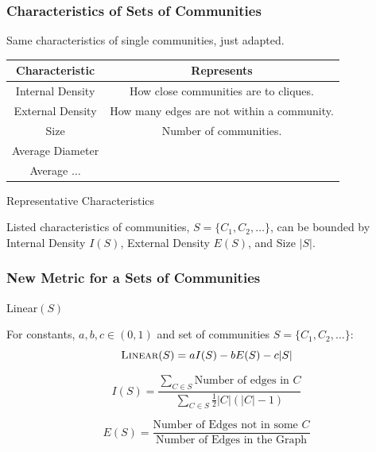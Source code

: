 \documentclass{beamer}
\begin{document}
\begin{frame}\frametitle{Characteristics of Sets of Communities}

Same characteristics of single communities, just adapted.

\begin{table}[t]
\centering
\begin{tabular}{c|c}
Characteristic & Represents \\ \hline
 {\sc Internal Density} &  How close communities are to cliques. \\
 {\sc External Density} & How many edges are not within a community. \\
 {\sc Size} & Number of communities.\\
 {\sc Average Diameter} &  \\
{\sc Average} $\dots$ &
\end{tabular}
\end{table}

\begin{block}{Representative Characteristics}
\begin{center}
Listed characteristics of  communities, $S = \{C_1, C_2, \dots\}$, can be bounded by {\sc Internal Density} $I(S)$, {\sc External Density} $E(S)$, and {\sc Size} $|S|$.
\end{center}
\end{block}
\end{frame}



\begin{frame}\frametitle{New Metric for a Sets of Communities}

\begin{block}{{\sc Linear}$(S)$}
\begin{center}
For constants, $a,b,c \in (0, 1)$ and set of communities $S = \{C_1, C_2, \dots \}$:
\begin{equation}
\mbox{\sc Linear}(S) = a I(S) - b E(S) - c |S| \nonumber
\end{equation}
\end{center}
\end{block}


\begin{definition}
\begin{equation}
I(S) = \frac{\sum_{C \in S}  \mbox{Number of edges in } C}{\sum_{C \in S} \frac{1}{2}|C|(|C| - 1)} \nonumber
\end{equation}
\end{definition}

\begin{definition}
\begin{equation}
E(S) = \frac{\mbox{Number of Edges not in some }C} {\mbox{Number of Edges in the Graph}} \nonumber
\end{equation}
\end{definition}

\end{frame}
\end{document}
